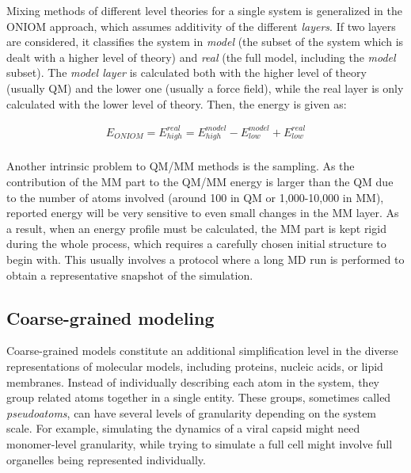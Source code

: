 Mixing methods of different level theories for a single system is generalized in the ONIOM approach, which assumes additivity of the different \textit{layers}. If two layers are considered, it classifies the system in \textit{model} (the subset of the system which is dealt with a higher level of theory) and \textit{real} (the full model, including the \textit{model} subset). The \textit{model layer} is calculated both with the higher level of theory (usually QM) and the lower one (usually a force field), while the real layer is only calculated with the lower level of theory. Then, the energy is given as:

\begin{align}
  E_{ONIOM}=E_{high}^{real}=E_{high}^{model}-E_{low}^{model}+E_{low}^{real} \\ \tag{ONIOM energy}
\end{align}


Another intrinsic problem to QM/MM methods is the sampling. As the contribution of the MM part to the QM/MM energy is larger than the QM due to the number of atoms involved (around 100 in QM or 1,000-10,000 in MM), reported energy will be very sensitive to even small changes in the MM layer. As a result, when an energy profile must be calculated, the MM part is kept rigid during the whole process, which requires a carefully chosen initial structure to begin with. This usually involves a protocol where a long MD run is performed to obtain a representative snapshot of the simulation.

\subsection{Coarse-grained modeling}

Coarse-grained models constitute an additional simplification level in the diverse representations of molecular models, including proteins,\cite{Kmiecik_2016,Ing_lfsson_2013} nucleic acids,\cite{Boniecki_2015,Potoyan_2012} or lipid membranes.\cite{Baron_2007} Instead of individually describing each atom in the system, they group related atoms together in a single entity. These groups, sometimes called \textit{pseudoatoms}, can have several levels of granularity depending on the system scale. For example, simulating the dynamics of a viral capsid might need monomer-level granularity,\cite{Hagan_2016} while trying to simulate a full cell might involve full organelles being represented individually.\cite{pivkin2008accurate}



